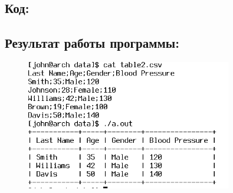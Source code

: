 \documentclass[14pt,a4paper]{article}
\begin{document}
\subsection{Код:}

\newpage
\subsection{Результат работы программы:}
\begin{figure}[h]
    \centering
    \includegraphics[width=0.8\textwidth]{data/demo15_3.png} %
\end{figure}
\end{document}
